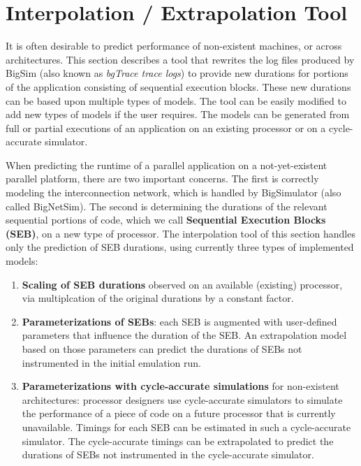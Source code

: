 %
\section{Interpolation / Extrapolation Tool\label{interpolation}}

It is often desirable to predict performance of non-existent machines, or across architectures.
This section describes a  tool that rewrites the  log files produced by BigSim (also known as {\em bgTrace trace
logs}) to provide new durations for portions of the application consisting of sequential execution blocks.
These new durations can be based upon multiple types of models.
The tool can be easily modified to add new types of models if the user requires.
The models can be generated from full or partial executions of an application on an existing processor or on a
cycle-accurate simulator. 


When predicting the runtime of a parallel application on a not-yet-existent
parallel platform, there are two important concerns. The first is correctly modeling the
interconnection network, which is handled by BigSimulator (also called BigNetSim). 
The second is determining the durations of the relevant sequential portions of code,
which we call \textbf{Sequential Execution Blocks (SEB)}, on a new type of processor.
The interpolation tool of this section handles only the prediction of SEB durations,
using currently three types of implemented models:

\begin{enumerate}
\item \textbf{Scaling of SEB durations} observed on an available (existing) processor, via multiplcation of
the original durations by a constant factor.
\item \textbf{Parameterizations of SEBs}: each SEB is augmented with user-defined parameters that
influence the duration of the SEB. An extrapolation model based on those parameters can
predict the durations of SEBs not instrumented in the initial emulation run.
\item \textbf{Parameterizations with cycle-accurate simulations} for non-existent architectures: 
processor designers use cycle-accurate simulators to simulate the performance of a piece of code on
a future processor that is currently unavailable.  Timings for each SEB can be estimated in such a cycle-accurate
simulator. The cycle-accurate timings can be extrapolated to predict the durations of SEBs not instrumented in the
cycle-accurate simulator.
\end{enumerate}

